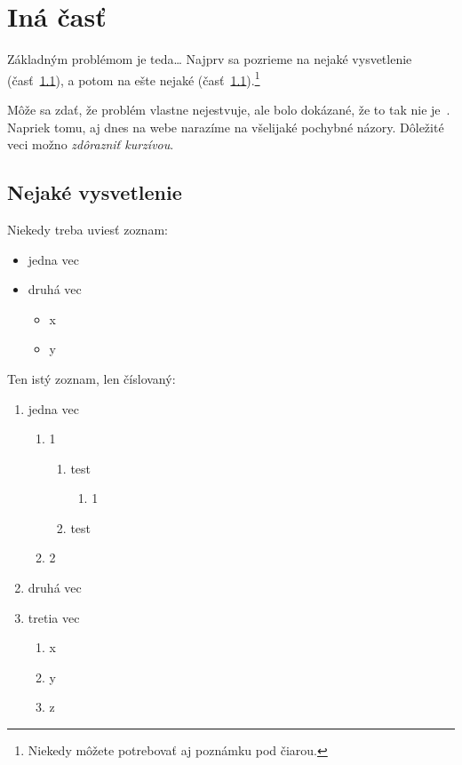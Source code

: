 \documentclass[10pt,twoside,slovak,a4paper]{coursepaper}
\begin{document}


\section{Iná časť} \label{ina}

Základným problémom je teda\ldots{} Najprv sa pozrieme na nejaké vysvetlenie (časť~\ref{ina:nejake}), a potom na ešte nejaké (časť~\ref{ina:nejake}).\footnote{Niekedy môžete potrebovať aj poznámku pod čiarou.}

Môže sa zdať, že problém vlastne nejestvuje\cite{Coplien:MPD}, ale bolo dokázané, že to tak nie je~\cite{Czarnecki:Staged, Czarnecki:Progress}. Napriek tomu, aj dnes na webe narazíme na všelijaké pochybné názory\cite{PLP-Framework}. Dôležité veci možno \emph{zdôrazniť kurzívou}.


\subsection{Nejaké vysvetlenie} \label{ina:nejake}

Niekedy treba uviesť zoznam:

\begin{itemize}
\item jedna vec
\item druhá vec
	\begin{itemize}
	\item x
	\item y
	\end{itemize}
\end{itemize}

Ten istý zoznam, len číslovaný:

\begin{enumerate}
\item jedna vec
	\begin{enumerate}
	\item 1
		\begin{enumerate}
		\item test
			\begin{enumerate}
			\item 1
			\end{enumerate}	
		\item test
		\end{enumerate}
	\item 2
	\end{enumerate}
\item druhá vec
\item tretia vec
	\begin{enumerate}
	\item x
	\item y
	\item z
	\end{enumerate}
\end{enumerate}
\end{document}
